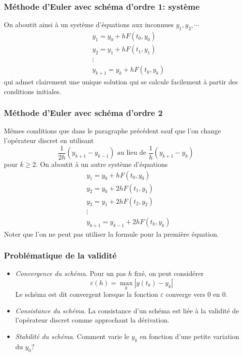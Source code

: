 \begin{frame}
  \frametitle{Méthode d'Euler avec schéma d'ordre 1: système}
On aboutit ainsi à un système d'équations aux inconnues $y_1,y_2,\cdots$
\begin{align*}
  &y_1 = y_0 + hF(t_0,y_0) \\ &y_2 = y_1 + hF(t_1,y_1) \\ &\vdots \\ &y_{k+1} = y_k + hF(t_k,y_k)
\end{align*}
qui admet clairement une unique solution qui se calcule facilement à partir des conditions initiales.
\end{frame}

\begin{frame}
  \frametitle{Méthode d'Euler avec schéma d'ordre 2}
Mêmes conditions que dans le paragraphe précédent sauf que l'on change l'opérateur discret en utilisant 
\begin{displaymath}
\frac{1}{2h}(y_{k+1}-y_{k-1}) \text{ au lieu de } \frac{1}{h}(y_{k+1}-y_{k})
\end{displaymath}
pour $k\geq 2$. On aboutit à un autre système d'équations
\begin{align*}
  &y_1 = y_0 + hF(t_0,y_0) \\ &y_2 = y_0 + 2hF(t_1,y_1)\\ &y_3 = y_1 + 2hF(t_2,y_2)\\ &\vdots \\ &y_{k+1} = y_{k-1} + 2hF(t_k,y_k)
\end{align*}
Noter que l'on ne peut pas utiliser la formule pour la première équation.
\end{frame}

\begin{frame}
  \frametitle{Problématique de la validité}
\begin{itemize}
  \item \emph{Convergence du schéma}. Pour un pas $h$ fixé, on peut considérer
\begin{displaymath}
  \varepsilon(h)=\max_{k}|y(t_k) - y_k|
\end{displaymath}
Le schéma est dit convergent lorsque la fonction $\varepsilon$ converge vers $0$ en $0$.
  \item \emph{Consistance du schéma}. La consistance d'un schéma est liée à la validité de l'opérateur discret comme approchant la dérivation.
  \item \emph{Stabilité du schéma}. Comment varie le $y_k$ en fonction d'une petite variation du $y_0$?
\end{itemize}
\end{frame}

